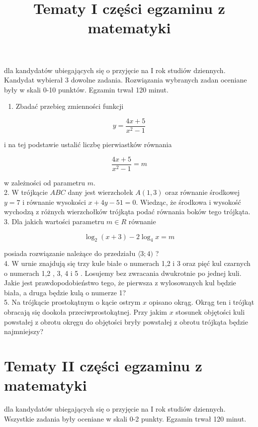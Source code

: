 \documentclass[10pt]{article}
\title{Tematy I części egzaminu z matematyki }
\author{}
\date{}
\begin{document}
\maketitle
dla kandydatów ubiegających się o przyjęcie na I rok studiów dziennych.\\
Kandydat wybierał 3 dowolne zadania. Rozwiązania wybranych zadan oceniane były w skali 0-10 punktów. Egzamin trwał 120 minut.

\begin{enumerate}
  \item Zbadać przebieg zmienności funkcji
\end{enumerate}

\[
y=\frac{4 x+5}{x^{2}-1}
\]

i na tej podstawie ustalić liczbę pierwiastków równania

\[
\frac{4 x+5}{x^{2}-1}=m
\]

w zależności od parametru \(m\).\\
2. W trójkącie \(A B C\) dany jest wierzchołek \(A(1,3)\) oraz równanie środkowej \(y=7\) i równanie wysokości \(x+4 y-51=0\). Wiedząc, że środkowa i wysokość wychodzą z różnych wierzchołków trójkąta podać równania boków tego trójkąta.\\
3. Dla jakich wartości parametru \(m \in R\) równanie

\[
\log _{2}(x+3)-2 \log _{4} x=m
\]

posiada rozwiązanie należące do przedziału \(\langle 3 ; 4)\) ?\\
4. W urnie znajdują się trzy kule białe o numerach 1,2 i 3 oraz pięć kul czarnych o numerach 1,2 , 3, 4 i 5 . Losujemy bez zwracania dwukrotnie po jednej kuli. Jakie jest prawdopodobieństwo tego, że pierwsza z wylosowanych kul będzie biała, a druga będzie kulą o numerze 1?\\
5. Na trójkącie prostokątnym o kącie ostrym \(x\) opisano okrąg. Okrąg ten i trójkąt obracają się dookoła przeciwprostokątnej. Przy jakim \(x\) stosunek objętości kuli powstałej z obrotu okręgu do objętości bryły powstałej z obrotu trójkąta będzie najmniejszy?

\section*{Tematy II części egzaminu z matematyki}
dla kandydatów ubiegających się o przyjęcie na I rok studiów dziennych.\\
Wszystkie zadania były oceniane w skali 0-2 punkty. Egzamin trwał 120 minut.
\end{document}
